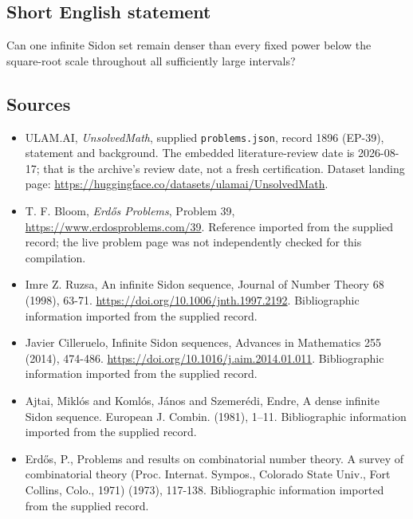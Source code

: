 \documentclass[11pt,a4paper]{article}
\begin{document}
\subsection{Short English statement}

Can one infinite Sidon set remain denser than every fixed power below the square-root scale throughout all sufficiently large intervals?

\subsection{Sources}

{\small

\begin{itemize}

\item[\hypertarget{source:1896:1}{S1}] ULAM.AI, \emph{UnsolvedMath}, supplied \texttt{problems.json}, record 1896 (EP-39), statement and background. The embedded literature-review date is 2026-08-17; that is the archive’s review date, not a fresh certification. Dataset landing page: \url{https://huggingface.co/datasets/ulamai/UnsolvedMath}.

\item[\hypertarget{source:1896:2}{S2}] T. F. Bloom, \emph{Erdős Problems}, Problem 39, \url{https://www.erdosproblems.com/39}. Reference imported from the supplied record; the live problem page was not independently checked for this compilation.

\item[\hypertarget{source:1896:3}{S3}] Imre Z. Ruzsa, An infinite Sidon sequence, Journal of Number Theory 68 (1998), 63-71. \url{https://doi.org/10.1006/jnth.1997.2192}. Bibliographic information imported from the supplied record.

\item[\hypertarget{source:1896:4}{S4}] Javier Cilleruelo, Infinite Sidon sequences, Advances in Mathematics 255 (2014), 474-486. \url{https://doi.org/10.1016/j.aim.2014.01.011}. Bibliographic information imported from the supplied record.

\item[\hypertarget{source:1896:5}{S5}] Ajtai, Mikl\'os and Koml\'os, J\'anos and Szemer\'{e}di, Endre, A dense infinite {S}idon sequence. European J. Combin. (1981), 1--11. Bibliographic information imported from the supplied record.

\item[\hypertarget{source:1896:6}{S6}] Erd\H{o}s, P., Problems and results on combinatorial number theory. A survey of combinatorial theory (Proc. Internat. Sympos., Colorado State Univ., Fort Collins, Colo., 1971) (1973), 117-138. Bibliographic information imported from the supplied record.

\end{itemize}

}

\label{end:1896}
\end{document}
